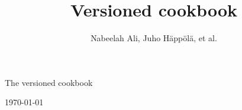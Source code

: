



\newcommand{\sthnolla}[0]{}

\title{Versioned cookbook}
\author{Nabeelah Ali, Juho H\"{a}pp\"{o}l\"{a}, et al.}



\begin{center}

\vspace{7 cm}
\huge
The versioned cookbook


\large
\vspace{1 cm}
\today{}

\vspace{5 cm}

\end{center}

\thispagestyle{empty}

\normalsize

\toc










